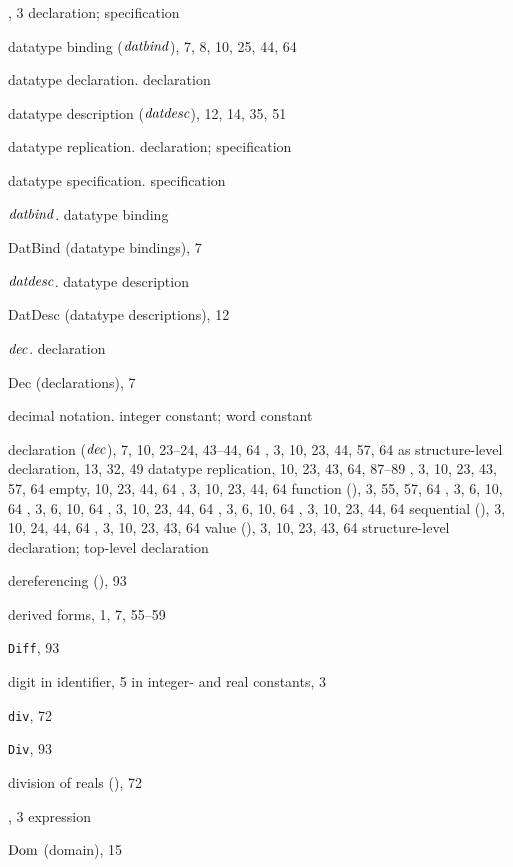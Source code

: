 \begin{theindex}
\item \DATATYPE, 3
\subitem \seealso declaration; specification
\item datatype binding (${\it datbind\/}$), 7, 8, 10, 25, 44, 64
\item datatype declaration. \see declaration
\item datatype description (${\it datdesc}$), 12, 14, 35, 51
\item datatype replication. \see declaration; specification
\item datatype specification. \see specification
\item ${\it datbind\/}$. \see datatype binding
\item DatBind (datatype bindings), 7
\item ${\it datdesc}$. \see datatype description
\item DatDesc (datatype descriptions), 12
\item ${\it dec}$. \see declaration
\item Dec (declarations), 7
\item decimal notation. \see integer constant; word constant
\item declaration (${\it dec}$), 7, 10, 23--24, 43--44, 64
\subitem {}, 3, 10, 23, 44, 57, 64
\subitem as structure-level declaration, 13, 32, 49
\subitem datatype replication, 10, 23, 43, 64, 87--89
\subitem {}, 3, 10, 23, 43, 57, 64
\subitem empty, 10, 23, 44, 64
\subitem {}, 3, 10, 23, 44, 64
\subitem function (), 3, 55, 57, 64
\subitem {}, 3, 6, 10, 64
\subitem {}, 3, 6, 10, 64
\subitem {}, 3, 10, 23, 44, 64
\subitem {}, 3, 6, 10, 64
\subitem {}, 3, 10, 23, 44, 64
\subitem sequential (\boxml{;}), 3, 10, 24, 44, 64
\subitem {}, 3, 10, 23, 43, 64
\subitem value (), 3, 10, 23, 43, 64
\subitem \seealso structure-level declaration; top-level declaration
\item dereferencing (\ml{!}), 93
\item derived forms, 1, 7, 55--59
\item {\tt Diff}, 93
\item digit 
\subitem in identifier, 5
\subitem in integer- and real constants, 3
\item {\tt div}, 72
\item {\tt Div}, 93
\item division of reals (\ml{/}), 72
\item \DO, 3
\subitem \seealso expression
\item $\mathop{\rm Dom}\nolimits$ (domain), 15

\end{theindex}
